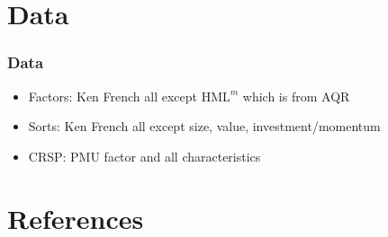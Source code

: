 \documentclass{beamer}
\begin{document}
\section{Data}

\begin{frame}
\frametitle{Data}
\begin{itemize}
    \item Factors: Ken French all except $\text{HML}^m$ which is from AQR
    \item Sorts: Ken French all except size, value, investment/momentum
    \item CRSP: PMU factor and all characteristics
\end{itemize}
\end{frame}

\section{References}

\begin{frame}[allowframebreaks]
  \printbibliography
\end{frame}
\end{document}
